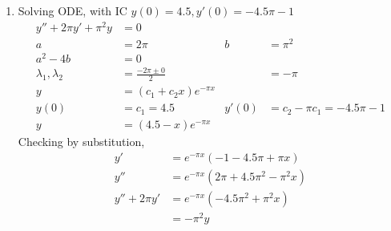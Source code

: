 \begin{enumerate}
    \item Solving ODE, with IC $ y(0) = 4.5, y'(0) = -4.5\pi - 1 $
          \begin{align}
              y'' + 2\pi y' + \pi ^{2}y & = 0                                 \\
              a                         & = 2\pi                            &
              b                         & = \pi ^{2}                          \\
              a^{2} - 4b                & = 0                                 \\
              \lambda_{1}, \lambda_{2}  & = \frac{-2\pi \pm 0}{2}           &
                                        & = -\pi                              \\
              y                         & = (c_{1}+ c_{2}x)e^{-\pi x}         \\
              y(0)                      & = c_{1} = 4.5                     &
              y'(0)                     & = c_{2} - \pi c_{1} = -4.5\pi - 1   \\
              y                         & =(4.5 - x)e^{-\pi x}
          \end{align}
          Checking by substitution,
          \begin{align}
              y'           & = e^{-\pi x}(-1 - 4.5\pi + \pi x)            \\
              y''          & = e^{-\pi x}(2\pi + 4.5\pi ^{2} - \pi ^{2}x) \\
              y''+ 2\pi y' & = e^{-\pi x}(-4.5 \pi ^{2} + \pi ^{2}x)      \\
                           & = -\pi ^{2}y
          \end{align}


\end{enumerate}
